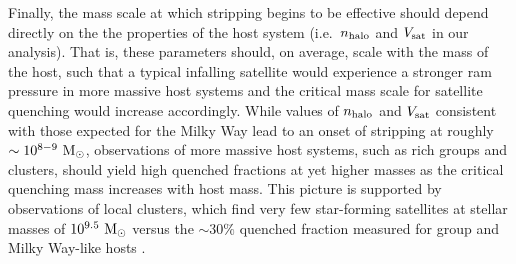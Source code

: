 Finally, the mass scale at which stripping begins to be effective
should depend directly on the the properties of the host system
(i.e.~$n_{\rm halo}$ and $V_{\rm sat}$ in our analysis).
%
That is, these parameters should, on average, scale with the mass of
the host, such that a typical infalling satellite would experience a
stronger ram pressure in more massive host systems and the critical
mass scale for satellite quenching would increase accordingly.
%
While values of $n_{\rm halo}$ and $V_{\rm sat}$ consistent with those
expected for the Milky Way lead to an onset of stripping at roughly
$\sim10^{8-9}~{\rm M}_{\odot}$, observations of more massive host systems, such
as rich groups and clusters, should yield high quenched fractions at
yet higher masses as the critical quenching mass increases with host
mass.
%
This picture is supported by observations of local clusters, which
find very few star-forming satellites at stellar masses of
$10^{9.5}~{\rm M}_{\odot}$ versus the $\sim 30\%$ quenched fraction measured for
group and Milky Way-like hosts \citep[e.g.][]{smith12, boselli14b,
  phillips15a, sj16}.



